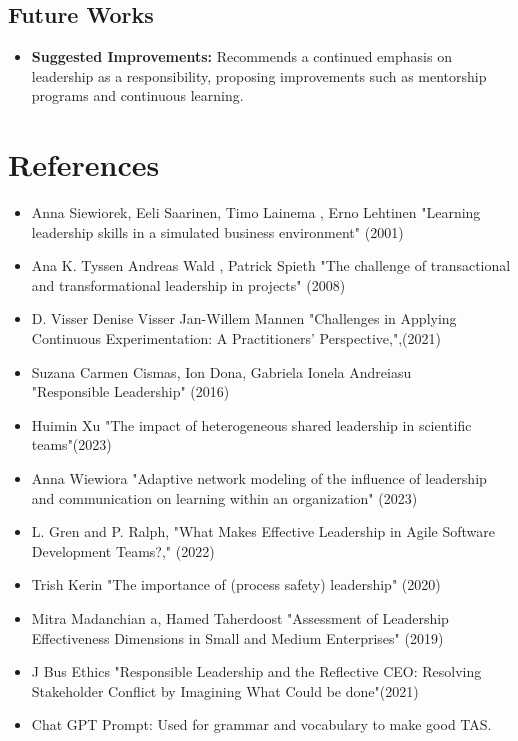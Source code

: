 \documentclass[a4paper,12pt]{report}
\begin{document}
\fontsize{14}{16}\selectfont \section{Future Works}
\fontsize{14}{20}\selectfont  
\begin{itemize}
\item  \textbf{Suggested Improvements:} Recommends a continued emphasis on leadership as a responsibility, proposing improvements such as mentorship programs and continuous learning.
\end{itemize}

\fontsize{14}{16}\selectfont \chapter{References}
\fontsize{14}{20}\selectfont
\begin{itemize}
\item Anna Siewiorek, Eeli Saarinen, Timo Lainema , Erno Lehtinen  "Learning leadership skills in a simulated business environment" (2001)
\item Ana K. Tyssen Andreas Wald , Patrick Spieth "The challenge of transactional and transformational leadership in projects" (2008)
\item D. Visser Denise Visser Jan-Willem Mannen "Challenges in Applying Continuous Experimentation: A Practitioners' Perspective,",(2021)
\item Suzana Carmen Cismas, Ion Dona, Gabriela Ionela Andreiasu \\"Responsible Leadership" (2016)
\item Huimin Xu "The impact of heterogeneous shared leadership in scientific teams"(2023)
\item Anna Wiewiora "Adaptive network modeling of the influence of leadership and communication on learning within an organization" (2023)
\item L. Gren and P. Ralph, "What Makes Effective Leadership in Agile Software Development Teams?," (2022)
\item Trish Kerin "The importance of (process safety) leadership" (2020)
\item Mitra Madanchian a, Hamed Taherdoost "Assessment of Leadership Effectiveness Dimensions in Small and Medium Enterprises" (2019)
\item J Bus Ethics "Responsible Leadership and the Reflective CEO: Resolving Stakeholder Conflict by Imagining What Could be done"(2021)
\item Chat GPT Prompt: Used for grammar and vocabulary to make good TAS.







\end{itemize}
\end{document}
